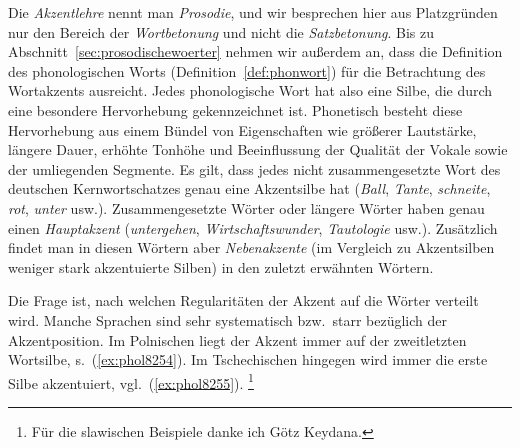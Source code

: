 \begin{exe}
  \ex\label{ex:phol8735}
  \begin{xlist}
  \end{xlist}
\end{exe}

Die \textit{Akzentlehre} nennt man \textit{Prosodie}, und wir besprechen hier aus Platzgründen nur den Bereich der \textit{Wortbetonung} und \zB nicht die \textit{Satzbetonung}.
Bis zu Abschnitt~\ref{sec:prosodischewoerter} nehmen wir außerdem an, dass die Definition des phonologischen Worts (Definition~\ref{def:phonwort}) für die Betrachtung des Wortakzents ausreicht.
Jedes phonologische Wort hat also eine Silbe, die durch eine besondere Hervorhebung gekennzeichnet ist.
Phonetisch besteht diese Hervorhebung aus einem Bündel von Eigenschaften wie größerer Lautstärke, längere Dauer, erhöhte Tonhöhe und Beeinflussung der Qualität der Vokale sowie der umliegenden Segmente.
Es gilt, dass jedes nicht zusammengesetzte Wort des deutschen Kernwortschatzes genau eine Akzentsilbe hat (\textit{\Akz Ball}, \textit{\Akz Tante}, \textit{\Akz schneite}, \textit{\Akz rot}, \textit{\Akz unter} usw.).
Zusammengesetzte Wörter oder längere Wörter haben genau einen \textit{Hauptakzent} (\textit{\Akz untergehen}, \textit{\Akz Wirtschaftswunder}, \textit{Tautolo\Akz gie} usw.).
Zusätzlich findet man in diesen Wörtern aber \textit{Nebenakzente} (im Vergleich zu Akzentsilben weniger stark akzentuierte Silben) in den zuletzt erwähnten Wörtern.


Die Frage ist, nach welchen Regularitäten der Akzent auf die Wörter verteilt wird.
Manche Sprachen sind sehr systematisch bzw.\ starr bezüglich der Akzentposition.
Im Polnischen liegt der Akzent immer auf der zweitletzten Wortsilbe, s.\ (\ref{ex:phol8254}).
Im Tschechischen hingegen wird immer die erste Silbe akzentuiert, vgl.\ (\ref{ex:phol8255}).%
\footnote{Für die slawischen Beispiele danke ich Götz Keydana.}

